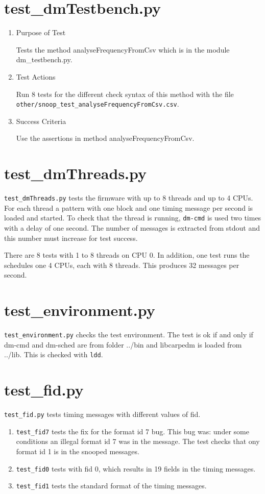 \documentclass[12pt,a4paper]{report}
\begin{document}
\section{test\_dmTestbench.py}
\begin{enumerate}
  \item Purpose of Test

  Tests the method analyseFrequencyFromCsv which is in
  the module dm\_testbench.py.
  \item Test Actions

  Run 8 tests for the different check syntax of this method with the
  file \texttt{other/snoop\_test\_analyseFrequencyFromCsv.csv}.
  \item Success Criteria

  Use the assertions in method analyseFrequencyFromCsv.
\end{enumerate}

\section{test\_dmThreads.py}
\texttt{test\_dmThreads.py} tests the firmware with up to 8 threads and up to 4 CPUs.
For each thread a pattern with one block and one timing message per second is
loaded and started. To check that the thread is running,
\texttt{dm-cmd} is used two times with a delay of one second. The number
of messages is extracted from stdout and this number must increase for test success.

There are 8 tests with 1 to 8 threads on CPU 0. In addition, one test runs
the schedules one 4 CPUs, each with 8 threads. This produces 32 messages per second.

\section{test\_environment.py}
\texttt{test\_environment.py} checks the test environment. The test is ok if and only if dm-cmd and dm-sched are
from folder ../bin and libcarpedm is loaded from ../lib. This is checked with \texttt{ldd}.

\section{test\_fid.py}
\texttt{test\_fid.py} tests timing messages with different values of fid.
\begin{enumerate}
\item \texttt{test\_fid7} tests the fix for the format id 7 bug. This bug
was: under some conditions an illegal format id 7 was in the message.
The test checks that ony format id 1 is in the snooped messages.
\item \texttt{test\_fid0} tests with fid 0, which results in 19 fields in the timing messages.
\item \texttt{test\_fid1} tests the standard format of the timing messages.
\end{enumerate}
\end{document}

